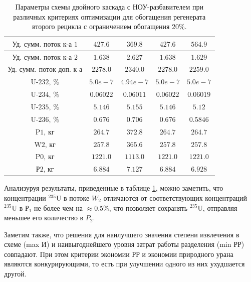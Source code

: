 \begin{table}
\begin{tabular}{ccccc}
        $\text{Уд. сумм. поток к-а 1}$ & $427.6$ & $369.8$ & $427.6$ & $564.9$\\ \hline
        $\text{Уд. сумм. поток к-а 2}$ & $1.638$ & $2.627$ & $1.638$ & $1.629$\\ \hline
        $\text{Уд. сумм. поток доп. к-а}$ & $2278.0$ & $2340.0$ & $2278.0$ & $2259.0$\\ \hline
        $\text{U-232, \%}$ & $5.0e-7$ & $4.94e-7$ & $5.0e-7$ & $5.0e-7$\\ \hline
        $\text{U-234, \%}$ & $0.06022$ & $0.06011$ & $0.06022$ & $0.06019$\\ \hline
        $\text{U-235, \%}$ & $5.146$ & $5.155$ & $5.146$ & $5.12$\\ \hline
        $\text{U-236, \%}$ & $0.676$ & $0.706$ & $0.676$ & $0.5846$\\ \hline
        $\text{P1, кг}$ & $264.7$ & $372.8$ & $264.7$ & $264.7$\\ \hline
        $\text{W2, кг}$ & $257.8$ & $365.6$ & $257.8$ & $257.8$\\ \hline
        $\text{P0, кг}$ & $1221.0$ & $1113.0$ & $1221.0$ & $1221.0$\\ \hline
        $\text{Р2, кг}$ & $6.884$ & $7.127$ & $6.884$ & $6.928$\\ \hline
    \end{tabular} 
\caption{Параметры схемы двойного каскада с НОУ-разбавителем при различных критериях оптимизации для обогащения регенерата второго рецикла с ограничением обогащения 20\%.{\label{2opt2_20}}}
\end{table}

Анализуруя результаты, приведенные в таблице \ref{2opt2_20}, можно заметить, что концентрации $^{235}$U в потоке $W_2$ отличаются от соответствующих  концентраций $^{235}$U в $Р_1$ не более чем на $\approx$0.5\%, что позволяет сохранять $^{235}$U, отправляя меньшее его количество в $P_2$.

Заметим также, что решения для наилучшего значения степени извлечения в схеме (max И) и наивыгоднейшего уровня затрат работы разделения (min РР) совпадают. При этом критерии экономии РР и экономии природного урана являются конкурирующими, то есть при улучшении одного из них ухудшается другой.

